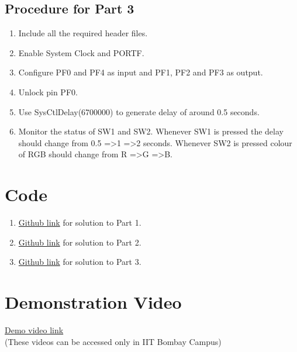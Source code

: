 \documentclass[a4paper,12pt,oneside]{book}
\begin{document}
\subsection{Procedure for Part 3}
\begin{enumerate}
\item Include all the required header files.
\item Enable System Clock and PORTF.
\item Configure PF0 and PF4 as input and PF1, PF2 and PF3 as output.
\item Unlock pin PF0.
\item Use SysCtlDelay(6700000) to generate delay of around 0.5 seconds.
\item Monitor the status of SW1 and SW2. Whenever SW1 is pressed the delay should change from 0.5 =\textgreater 1 =\textgreater 2 seconds. Whenever SW2 is pressed colour of RGB should change from R =\textgreater G =\textgreater B.
\end{enumerate}

\newpage
\section{Code}
\begin{enumerate}
\item \href{https://github.com/eYSIP-2016/eYSIP-2016-Around-the-world-of-Embedded-Systems/blob/origin/master/Solutions/lab1\%20solutions/lab_1-problem1.c}{Github link} for solution to Part 1.
\item \href{https://github.com/eYSIP-2016/eYSIP-2016-Around-the-world-of-Embedded-Systems/blob/origin/master/Solutions/lab1\%20solutions/lab_1-problem\%202.c}{Github link} for solution to Part 2.
\item \href{https://github.com/eYSIP-2016/eYSIP-2016-Around-the-world-of-Embedded-Systems/blob/origin/master/Solutions/lab1\%20solutions/lab_1-problem3.c}{Github link} for solution to Part 3.
\end{enumerate}

\section{Demonstration Video}

\href{http://10.129.139.139/videos/Lab1.html}{Demo video link} \\
(These videos can be accessed only in IIT Bombay Campus)
\end{document}
